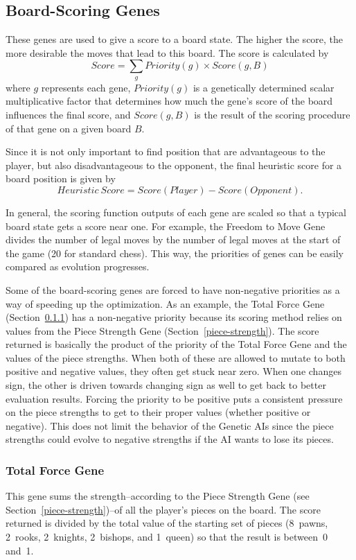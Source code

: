 \documentclass[letterpaper]{article}
\renewcommand{\_}{\allowbreak\textunderscore\allowbreak}
\begin{document}
\subsection{Board-Scoring Genes}\label{board-score-section}

These genes are used to give a score to a board state. The higher the score, the more desirable the moves that lead to this board. The score is calculated by
\[Score = \sum_g Priority(g) \times Score(g,B)\]
where \(g\) represents each gene, \(Priority(g)\) is a genetically determined scalar multiplicative factor that determines how much the gene's score of the board influences the final score, and \(Score(g,B)\) is the result of the scoring procedure of that gene on a given board \(B\).

Since it is not only important to find position that are advantageous to the player, but also disadvantageous to the opponent, the final heuristic score for a board position is given by
\[Heuristic\ Score = Score(Player) - Score(Opponent).\]

In general, the scoring function outputs of each gene are scaled so that a typical board state gets a score near one. For example, the Freedom to Move Gene divides the number of legal moves by the number of legal moves at the start of the game (20 for standard chess). This way, the priorities of genes can be easily compared as evolution progresses.

Some of the board-scoring genes are forced to have non-negative priorities as a way of speeding up the optimization. As an example, the Total Force Gene (Section~\ref{total-force}) has a non-negative priority because its scoring method relies on values from the Piece Strength Gene (Section~\ref{piece-strength}). The score returned is basically the product of the priority of the Total Force Gene and the values of the piece strengths. When both of these are allowed to mutate to both positive and negative values, they often get stuck near zero. When one changes sign, the other is driven towards changing sign as well to get back to better evaluation results. Forcing the priority to be positive puts a consistent pressure on the piece strengths to get to their proper values (whether positive or negative). This does not limit the behavior of the Genetic AIs since the piece strengths could evolve to negative strengths if the AI wants to lose its pieces.

\subsubsection{Total Force Gene}\label{total-force}
This gene sums the strength--according to the Piece Strength Gene (see Section~\ref{piece-strength})--of all the player's pieces on the board. The score returned is divided by the total value of the starting set of pieces (8~pawns, 2~rooks, 2~knights, 2~bishops, and 1~queen) so that the result is between~0 and~1.
\end{document}
